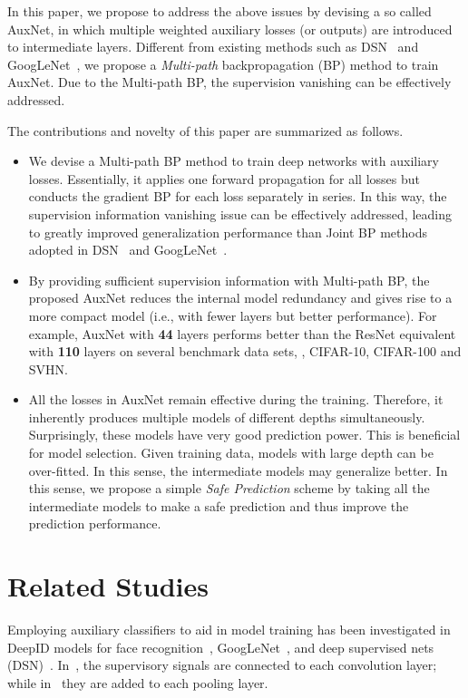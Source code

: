 \documentclass[10pt,onecolumn,letterpaper]{article}
\def\SexyName{AuxNet\xspace}
\begin{document}
In this paper, we propose to address the above issues by devising a so called \SexyName, in which multiple weighted auxiliary losses (or outputs) are introduced to intermediate layers.  Different from existing methods such as  DSN~\cite{Lee2015} and GoogLeNet~\cite{szegedy2015going}, we propose a \emph{{Multi-path}} backpropagation (BP) method to train \SexyName.
Due to the Multi-path BP, the supervision vanishing can be effectively addressed.





The contributions  and novelty of this paper are summarized as follows.
\begin{itemize}
\vspace{-0.5em}
\item We devise a Multi-path BP method to train deep networks with auxiliary losses. Essentially, it applies one forward propagation for all losses but conducts the gradient BP for each loss separately in series. In this way, the supervision information vanishing issue can be effectively addressed, leading to greatly improved generalization performance than Joint BP methods adopted in DSN~\cite{Lee2015} and GoogLeNet~\cite{szegedy2015going}.
\vspace{-0.5em}
\item By providing sufficient supervision information with Multi-path BP, the proposed \SexyName reduces the internal model redundancy and gives rise to a more compact model (i.e., with fewer layers but better performance). For example, AuxNet with \textbf{44} layers performs better than the ResNet equivalent with \textbf{110} layers on several benchmark data sets, \ie, CIFAR-10, CIFAR-100 and SVHN.
\vspace{-0.5em}
\item All the losses in \SexyName remain effective during the training. Therefore, it inherently produces multiple models of different depths simultaneously. Surprisingly, these models have very good prediction power. This is beneficial for model selection. Given training data, models with large depth can be over-fitted. In this sense, the intermediate models may generalize better. In this sense, we propose a simple \emph{Safe Prediction} scheme by taking all the intermediate models to make a safe prediction and thus improve the prediction performance.

\end{itemize}




\section{Related Studies}\label{sec:related_Studies}
Employing auxiliary classifiers to aid in model training has been investigated in DeepID models for face recognition~\cite{sun2015deeply,sun2015deepid3}, GoogLeNet~\cite{szegedy2015going}, and deep supervised nets (DSN)~\cite{Lee2015,wang2015training}. In~\cite{sun2015deeply},  the supervisory signals are connected to each convolution layer; while in~\cite{sun2015deepid3} they are added to each pooling layer.
\end{document}
